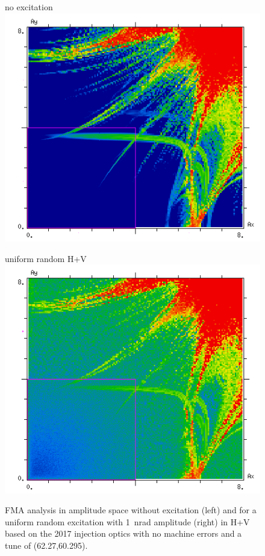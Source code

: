 \documentclass[%
 reprint,
 amsmath,amssymb,
 aps,
prstab,
longbibliography
]{revtex4-1}
\begin{document}
\begin{figure}
	\begin{minipage}[t]{0.49\linewidth}
		\centering
		no excitation
		\includegraphics[width=1.0\linewidth]{2017injnocolc15o+19_6noerru_dp0_amp.png}
	\end{minipage}
	\begin{minipage}[t]{0.49\linewidth}
		\centering
		uniform random H+V
		\includegraphics[width=1.0\linewidth]{2017injnocolc15o+19_6noerruranadthv_1nrad_dp0_amp.png}
	\end{minipage}	
	\caption{\label{fig:ran2017fmaamp} FMA analysis in amplitude space without excitation (left) and for a uniform random excitation with 1~nrad amplitude (right) in H+V based on the 2017 injection optics with no machine errors and a tune of (62.27,60.295).}
\end{figure}
\end{document}
